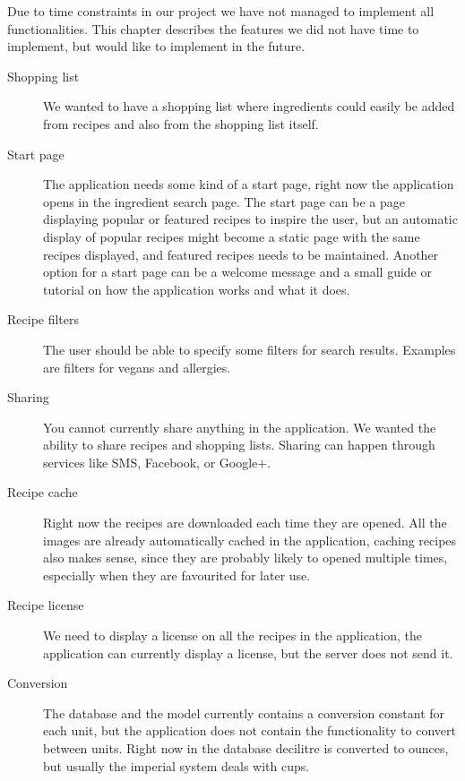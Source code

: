 Due to time constraints in our project we have not managed to implement all functionalities. This chapter describes the features we did not have time to implement, but would like to implement in the future.

\begin{description}
\item[Shopping list] We wanted to have a shopping list where ingredients could easily be added from recipes and also from the shopping list itself.

\item[Start page] The application needs some kind of a start page, right now the application opens in the ingredient search page. The start page can be a page displaying popular or featured recipes to inspire the user, but an automatic display of popular recipes might become a static page with the same recipes displayed, and featured recipes needs to be maintained. Another option for a start page can be a welcome message and a small guide or tutorial on how the application works and what it does.

\item[Recipe filters] The user should be able to specify some filters for search results. Examples are filters for vegans and allergies.

\item[Sharing] You cannot currently share anything in the application. We wanted the ability to share recipes and shopping lists. Sharing can happen through services like SMS, Facebook, or Google+.

\item[Recipe cache] Right now the recipes are downloaded each time they are opened. All the images are already automatically cached in the application, caching recipes also makes sense, since they are probably likely to opened multiple times, especially when they are favourited for later use.

\item[Recipe license] We need to display a license on all the recipes in the application, the application can currently display a license, but the server does not send it.

\item[Conversion] The database and the model currently contains a conversion constant for each unit, but the application does not contain the functionality to convert between units. Right now in the database decilitre is converted to ounces, but usually the imperial system deals with cups.


\end{description}
